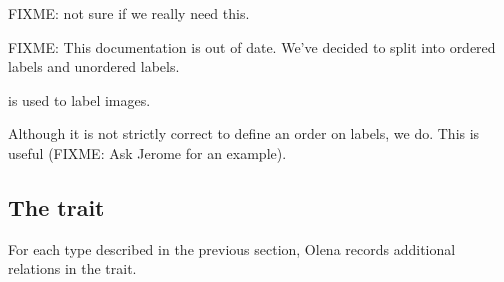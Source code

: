 FIXME: not sure if we really need this.

FIXME: This documentation is out of date.  We've decided to split
 into ordered labels and unordered labels.

 is used to label images.

Although it is not strictly correct to define an order on labels,
we do.  This is useful (FIXME: Ask Jerome for an example).

\subsection{The  trait}

For each type  described in the previous section, Olena
records additional relations in the  trait.

